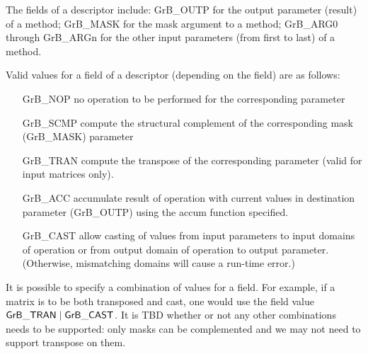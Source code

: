 The fields of a descriptor include: {\sf GrB\_OUTP} for the output parameter 
(result) of a method; {\sf GrB\_MASK} for the mask argument to a method; 
{\sf GrB\_ARG0} through {\sf GrB\_ARGn} for the other input parameters 
(from first to last) of a method.


Valid values for a field of a descriptor (depending on the field) are as follows:

\begin{itemize}[leftmargin=1.5in]
\item[{\sf GrB\_NOP}]    no operation to be performed for the corresponding parameter
\item[{\sf GrB\_SCMP}]   compute the structural complement of the corresponding mask
                         (GrB\_MASK) parameter
\item[{\sf GrB\_TRAN}]   compute the transpose of the corresponding parameter (valid
                         for input matrices only).
\item[{\sf GrB\_ACC}]    accumulate result of operation with current values in
                         destination parameter (GrB\_OUTP) using the {\sf accum} function
                         specified.
\item[{\sf GrB\_CAST}]   allow casting of values from input parameters to input domains 
                         of operation or from output domain of operation to output 
                         parameter. (Otherwise, mismatching domains will cause a 
                         run-time error.)
\end{itemize}

It is possible to specify a combination of values for a field. For 
example, if a matrix is to be both transposed and cast, one would use the field value
${\sf GrB\_TRAN} \mid {\sf GrB\_CAST}$.  It is TBD whether or not any other combinations
needs to be supported: only masks can be complemented and we may not need to support
transpose on them.

